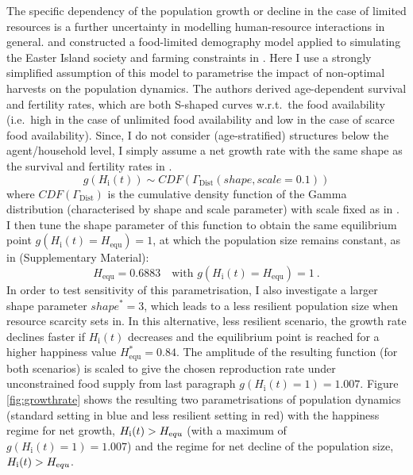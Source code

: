 The specific dependency of the population growth or decline in the case of limited resources is a further uncertainty in modelling human-resource interactions in general.
\citet{Lee2008} and \citet{Puleston2008} constructed a food-limited demography model applied to simulating the Easter Island society and farming constraints in \citet{Puleston2017}. 
Here I use a strongly simplified assumption of this model to parametrise the impact of non-optimal harvests on the population dynamics. 
The authors derived age-dependent survival and fertility rates, which are both S-shaped curves w.r.t.\ the food availability (i.e.\ high in the case of unlimited food availability and low in the case of scarce food availability).
Since, I do not consider (age-stratified) structures below the agent/household level, I simply assume a net growth rate with the same shape as the survival and fertility rates in \citet{Lee2008}.
\begin{equation}
g(H_\text{i}(t)) \sim CDF(\Gamma_\text{Dist}(shape, scale=0.1))
\end{equation}
where $CDF(\Gamma_\text{Dist})$ is the cumulative density function of the Gamma distribution (characterised by shape and scale parameter) with scale fixed as in \citet{Lee2008}.
I then tune the shape parameter of this function to obtain the same equilibrium point $g(H_\text{i}(t) =H_\text{equ})=1$, at which the population size remains constant, as in \citet{Puleston2017} (Supplementary Material):
\begin{equation}
H_\text{equ}=0.6883 \quad \text{with } g(H_\text{i}(t) = H_\text{equ})=1   \ .
\end{equation} 
In order to test sensitivity of this parametrisation, I also investigate a larger shape parameter $shape^*=3$, which leads to a less resilient population size when resource scarcity sets in.
In this alternative, less resilient scenario, the growth rate declines faster if $H_\text{i}(t)$ decreases and the equilibrium point is reached for a higher happiness value $H_\text{equ}^*=0.84$.  %
The amplitude of the resulting function (for both scenarios) is scaled to give the chosen reproduction rate under unconstrained food supply from last paragraph 
$g(H_\text{i}(t)=1)=1.007$.
Figure \ref{fig:growthrate} shows the resulting two parametrisations of population dynamics (standard setting in blue and less resilient setting in red) with the happiness regime for net growth, $H_\text{i}(t) > H_{\text equ}$ (with a maximum of $g(H_\text{i}(t)=1)=1.007$) and the regime for net decline of the population size, $H_\text{i}(t) > H_{\text equ}$.
